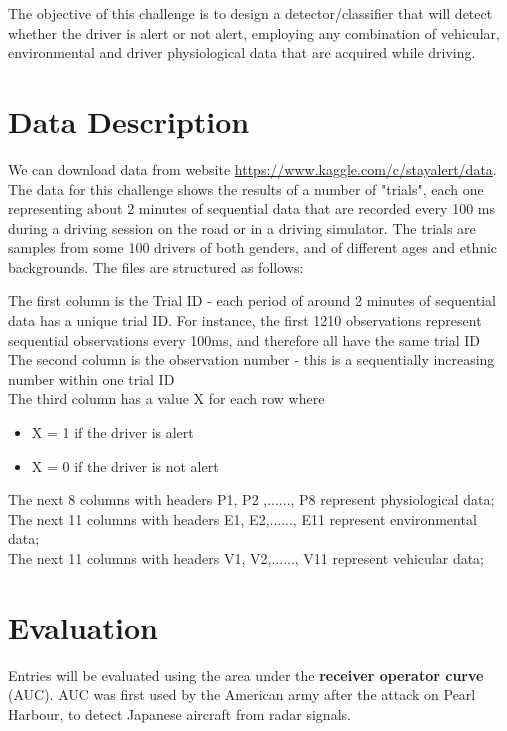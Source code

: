 \documentclass[11pt]{article}
\begin{document}
The objective of this challenge is to design a detector/classifier that will detect whether the driver is alert or not alert, employing any combination of vehicular, environmental and driver physiological data that are acquired while driving.

\section{Data Description} %
We can download data from website \url{https://www.kaggle.com/c/stayalert/data}. The data for this challenge shows the results of a number of "trials", each one representing about 2 minutes of sequential data that are recorded every 100 ms during a driving session on the road or in a driving simulator.  The trials are samples from some 100 drivers of both genders, and of different ages and ethnic backgrounds. The files are structured as follows:

The first column is the Trial ID - each period of around 2 minutes of sequential data has a unique trial ID. For instance, the first 1210 observations represent sequential observations every 100ms, and therefore all have the same trial ID \\
The second column is the observation number - this is a sequentially increasing number within one trial ID \\
The third column has a value X for each row where   
\begin{itemize}
\item X = 1     if the driver is alert 
\item X = 0     if the driver is not alert 
\end{itemize}
The next 8 columns with headers P1, P2 ,......, P8  represent physiological data;\\
The next 11 columns with headers E1, E2,......, E11  represent environmental data;\\
The next 11 columns with headers V1, V2,......, V11  represent vehicular  data;

\section{Evaluation}
Entries will be evaluated using the area under the \textbf{receiver operator curve} (AUC). AUC was first used by the American army after the attack on Pearl Harbour, to detect Japanese aircraft from radar signals.
\end{document}
